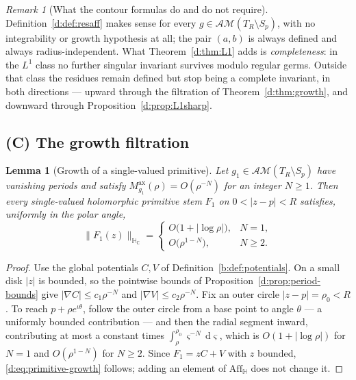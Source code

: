 \documentclass[11pt,a4paper]{article}
\numberwithin{equation}{section}
\newtheorem{lemma}[theorem]{Lemma}
\theoremstyle{definition}
\theoremstyle{remark}
\newtheorem{remark}[theorem]{Remark}
\theoremstyle{plain}
\newcommand{\HH}{\mathbb H}
\newcommand{\HC}{\mathbb H_{\mathbb C}}
\newcommand{\AM}{\mathcal{AM}}
\newcommand{\Aff}{\mathrm{Aff}_{\HH}}
\newcommand{\pot}{C}          %
\newcommand{\potV}{V}         %
\newcommand{\Sp}{S_{p}}
\newcommand{\Max}{M^{\mathrm{ax}}}                    %
\newcommand{\Tube}{T}
\newcommand{\abs}[1]{\lvert #1\rvert}
\newcommand{\norm}[1]{\lVert #1\rVert}
\newcommand{\dd}{\mathrm d}
\begin{document}
\begin{remark}[What the contour formulas do and do not require]
\label{d:rem:contour-scope}
Definition~\ref{d:def:resaff} makes sense for every
$g\in\AM(\Tube_R\setminus\Sp)$, with no integrability or growth hypothesis
at all; the pair $(a,b)$ is always defined and always radius-independent.
What Theorem~\ref{d:thm:L1} adds is \emph{completeness}: in the $L^1$ class
no further singular invariant survives modulo regular germs.  Outside that
class the residues remain defined but stop being a complete invariant, in
both directions --- upward through the filtration of
Theorem~\ref{d:thm:growth}, and downward through
Proposition~\ref{d:prop:L1sharp}.
\end{remark}

\subsection{(C) The growth filtration}

\begin{lemma}[Growth of a single-valued primitive]
\label{d:lem:primitive-growth}
Let $g_1\in\AM(\Tube_R\setminus\Sp)$ have vanishing periods and satisfy
$\Max_{g_1}(\rho)=O(\rho^{-N})$ for an integer $N\ge1$.  Then every
single-valued holomorphic primitive stem $F_1$ on $0<\abs{z-p}<R$ satisfies,
uniformly in the polar angle,
\begin{equation}
 \norm{F_1(z)}_{\HC}=
 \begin{cases}
  O\bigl(1+\abs{\log\rho}\bigr), & N=1,\\[2pt]
  O\bigl(\rho^{1-N}\bigr), & N\ge2 .
 \end{cases}
 \label{d:eq:primitive-growth}
\end{equation}
\end{lemma}

\begin{proof}
Use the global potentials $\pot,\potV$ of
Definition~\ref{b:def:potentials}.  On a small disk
$\abs z$ is bounded, so the pointwise bounds of
Proposition~\ref{d:prop:period-bounds} give
$\abs{\nabla\pot}\le c_1\rho^{-N}$ and $\abs{\nabla\potV}\le c_2\rho^{-N}$.
Fix an outer circle $\abs{z-p}=\rho_0<R$.  To reach
$p+\rho e^{\iota\theta}$, follow the outer circle from a base point to
angle $\theta$ --- a uniformly bounded contribution --- and then the radial
segment inward, contributing at most a constant times
$\int_\rho^{\rho_0}\varsigma^{-N}\,\dd\varsigma$, which is
$O(1+\abs{\log\rho})$ for $N=1$ and $O(\rho^{1-N})$ for $N\ge2$.  Since
$F_1=z\pot+\potV$ with $z$ bounded, \eqref{d:eq:primitive-growth} follows;
adding an element of $\Aff$ does not change it.
\end{proof}
\end{document}
